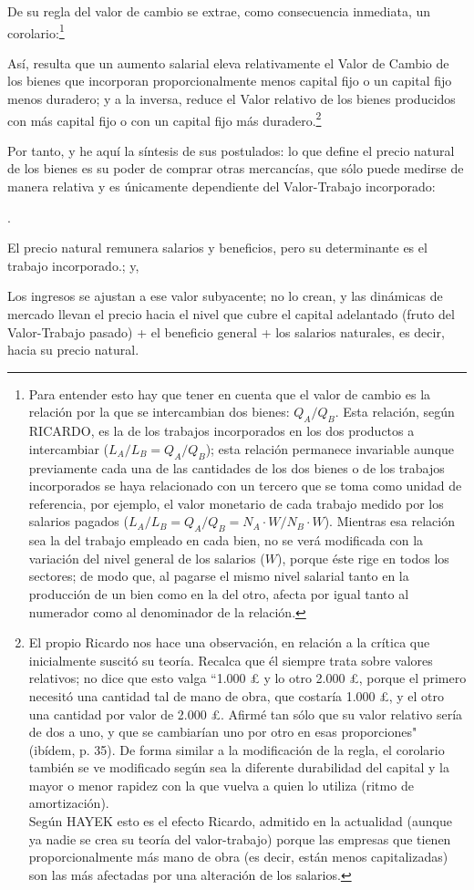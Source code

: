 \documentclass[10pt,a4paper]{article}
\newcounter{numitem}
\newenvironment{lnum}
      {\begin{list}{\arabic{numitem}.}{%
          \usecounter{numitem}%
          \setlength{\leftmargin}{1cm}%
          \setlength{\parskip}{3pt}%
          \setlength{\itemsep}{0pt}%
          \setlength{\parsep}{0pt}%
      }}
      {\end{list}}
\begin{document}
De su regla del valor de cambio se extrae, como consecuencia inmediata, un corolario:\footnote{%
    Para entender esto hay que tener en cuenta que el valor de cambio es la relación por la que se intercambian dos bienes: $Q_A/Q_B$. Esta relación, según RICARDO, es la de los trabajos incorporados en los dos productos a intercambiar ($L_A/L_B = Q_A/Q_B$); esta relación permanece invariable aunque previamente cada una de las cantidades de los dos bienes o de los trabajos incorporados se haya relacionado con un tercero que se toma como unidad de referencia, por ejemplo, el valor monetario de cada trabajo medido por los salarios pagados ($L_A/L_B = Q_A/Q_B = N_A·W /N_B·W$). Mientras esa relación sea la del trabajo empleado en cada bien, no se verá modificada con la variación del nivel general de los salarios ($W$), porque éste rige en todos los sectores; de modo que, al pagarse el mismo nivel salarial tanto en la producción de un bien como en la del otro, afecta por igual  tanto al numerador como al denominador de la relación.
}



Así, resulta que un aumento salarial eleva relativamente el Valor de Cambio de los bienes que incorporan proporcionalmente menos capital fijo o un capital fijo menos duradero; y a la inversa, reduce el Valor relativo de los bienes producidos con más capital fijo o con un capital fijo más duradero.\footnote{%
    El propio Ricardo nos hace una observación, en relación a la crítica que inicialmente suscitó su teoría. Recalca que él siempre trata sobre valores relativos; no dice que esto valga “1.000 £ y lo otro 2.000 £, porque el primero necesitó una cantidad tal de mano de obra, que costaría 1.000 £, y el otro una cantidad por valor de 2.000 £. Afirmé tan sólo que su valor relativo sería de dos a uno, y que se cambiarían uno por otro en esas proporciones" (ibídem, p. 35). De forma similar a la modificación de la regla, el corolario también se ve modificado según sea la diferente durabilidad del capital y la mayor o menor rapidez con la que vuelva a quien lo utiliza (ritmo de amortización).\\
Según HAYEK esto es el efecto Ricardo, admitido en la actualidad (aunque ya nadie se crea su teoría del valor-trabajo) porque las empresas que tienen proporcionalmente más mano de obra (es decir, están menos capitalizadas) son las más afectadas por una alteración de los salarios.
} 

Por tanto, y he aquí la síntesis de sus postulados: lo que define el precio natural de los bienes es su poder de comprar otras mercancías, que sólo puede medirse de manera relativa y es únicamente dependiente del Valor-Trabajo incorporado:
\begin{lnum}
    \item El precio natural remunera salarios y beneficios, pero su determinante es el trabajo incorporado.; y,
    \item Los ingresos se ajustan a ese valor subyacente; no lo crean, y las dinámicas de mercado llevan el precio hacia el nivel que cubre el capital adelantado (fruto del Valor-Trabajo pasado) + el beneficio general + los salarios naturales, es decir, hacia su precio natural.
\end{lnum}
\end{document}
